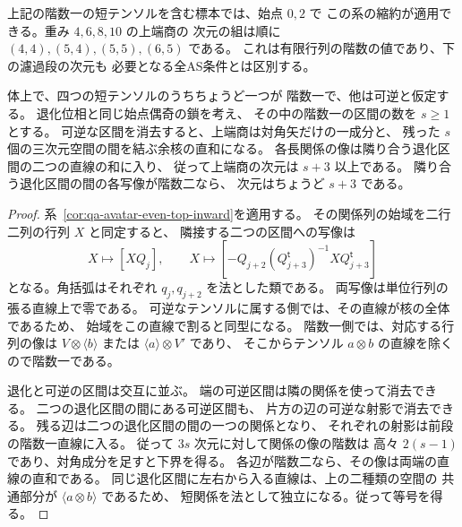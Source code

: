上記の階数一の短テンソルを含む標本では、始点 $0,2$ で
この系の縮約が適用できる。重み $4,6,8,10$ の上端商の
次元の組は順に $(4,4),(5,4),(5,5),(6,5)$ である。
これは有限行列の階数の値であり、下の濾過段の次元も
必要となる全AS条件とは区別する。

\begin{corollary}[一つの退化位相を持つ偶数上端商]
\label{cor:qa-avatar-even-top-single-degenerate}
体上で、四つの短テンソルのうちちょうど一つが
階数一で、他は可逆と仮定する。
退化位相と同じ始点偶奇の鎖を考え、
その中の階数一の区間の数を $s\geq1$ とする。
可逆な区間を消去すると、上端商は対角矢だけの一成分と、
残った $s$ 個の三次元空間の間を結ぶ余核の直和になる。
各長関係の像は隣り合う退化区間の二つの直線の和に入り、
従って上端商の次元は $s+3$ 以上である。
隣り合う退化区間の間の各写像が階数二なら、
次元はちょうど $s+3$ である。
\end{corollary}
\begin{proof}
系~\ref{cor:qa-avatar-even-top-inward}を適用する。
その関係列の始域を二行二列の行列 $X$ と同定すると、
隣接する二つの区間への写像は
\[
   X\longmapsto [XQ_j],\qquad
   X\longmapsto [-Q_{j+2}(Q_{j+3}^{\mathsf t})^{-1}
                               XQ_{j+3}^{\mathsf t}]
\]
となる。角括弧はそれぞれ $q_j,q_{j+2}$ を法とした類である。
両写像は単位行列の張る直線上で零である。
可逆なテンソルに属する側では、その直線が核の全体であるため、
始域をこの直線で割ると同型になる。
階数一側では、対応する行列の像は
$V\otimes\langle b\rangle$ または
$\langle a\rangle\otimes V'$ であり、
そこからテンソル $a\otimes b$ の直線を除くので階数一である。

退化と可逆の区間は交互に並ぶ。
端の可逆区間は隣の関係を使って消去できる。
二つの退化区間の間にある可逆区間も、
片方の辺の可逆な射影で消去できる。
残る辺は二つの退化区間の間の一つの関係となり、
それぞれの射影は前段の階数一直線に入る。
従って $3s$ 次元に対して関係の像の階数は
高々 $2(s-1)$ であり、対角成分を足すと下界を得る。
各辺が階数二なら、その像は両端の直線の直和である。
同じ退化区間に左右から入る直線は、上の二種類の空間の
共通部分が $\langle a\otimes b\rangle$ であるため、
短関係を法として独立になる。従って等号を得る。
\end{proof}

